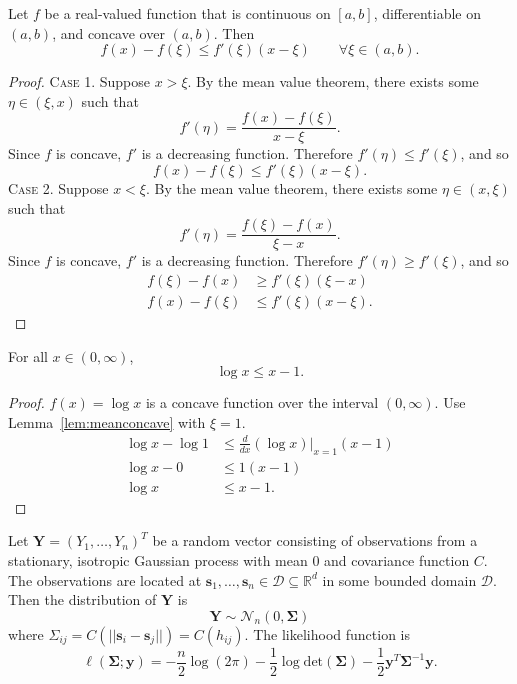 \label{app:theorems_and_proofs}

\begin{lemma} \label{lem:meanconcave}
  Let $f$ be a real-valued function that is continuous on $[a, b]$, differentiable on $(a, b)$, and concave over $(a, b)$. Then
  \[
    f(x) - f(\xi) \leq f'(\xi) (x - \xi) \qquad \forall \xi \in (a, b).
  \]
\end{lemma}

\begin{proof}
  \textsc{Case 1.} Suppose $x > \xi$. By the mean value theorem, there exists some $\eta \in (\xi, x)$ such that
  \[
    f'(\eta) = \frac{f(x) - f(\xi)}{x - \xi}.
  \]
  Since $f$ is concave, $f'$ is a decreasing function. Therefore $f'(\eta) \leq f'(\xi)$, and so
  \[
    f(x) - f(\xi) \leq f'(\xi) (x - \xi).
  \]
  \textsc{Case 2.} Suppose $x < \xi$. By the mean value theorem, there exists some $\eta \in (x, \xi)$ such that
  \[
    f'(\eta) = \frac{f(\xi) - f(x)}{\xi - x}.
  \]
  Since $f$ is concave, $f'$ is a decreasing function. Therefore $f'(\eta) \geq f'(\xi)$, and so
  \begin{align*}
    f(\xi) - f(x) &\geq f'(\xi) (\xi - x) \\
    f(x) - f(\xi) &\leq f'(\xi) (x - \xi).
  \end{align*}
\end{proof}

\begin{lemma} \label{lem:logineq}
  For all $x \in (0, \infty)$,
  \[
    \log x \leq x - 1.
  \]
\end{lemma}

\begin{proof}
  $f(x) = \log x$ is a concave function over the interval $(0, \infty)$. Use Lemma~\ref{lem:meanconcave} with $\xi = 1$.
  \begin{align*}
    \log x - \log 1 &\leq \frac{d}{dx}(\log x) \Big|_{x=1} (x - 1) \\
    \log x - 0 &\leq 1 (x - 1) \\
    \log x &\leq x - 1.
  \end{align*}
\end{proof}

Let $\bm{Y} = (Y_1, \dots, Y_n)^T$ be a random vector consisting of observations from a stationary, isotropic Gaussian process with mean 0 and covariance function $C$. The observations are located at $\bm{s}_1, \dots, \bm{s}_n \in \mathcal{D} \subseteq \mathbb{R}^d$ in some bounded domain $\mathcal{D}$. Then the distribution of $\bm{Y}$ is
\[
  \bm{Y} \sim \mathcal{N}_n(0, \bm{\Sigma})
\]
where $\Sigma_{ij} = C(||\bm{s}_i - \bm{s}_j||) = C(h_{ij})$. The likelihood function is
\[
  \ell(\bm{\Sigma}; \bm{y}) = -\frac{n}{2} \log(2\pi) - \frac{1}{2} \log \textrm{det}(\bm{\Sigma}) - \frac{1}{2} \bm{y}^T \bm{\Sigma}^{-1} \bm{y}.
\]


